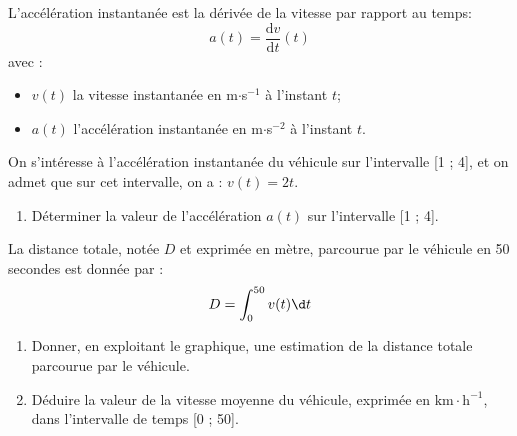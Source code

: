 L'accélération instantanée est la dérivée de la vitesse par rapport au temps:
\[a(t)=\dfrac{\mathrm{d}v}{\mathrm{d}t}(t)\]
avec :
\begin{itemize}[label=$\bullet$]
\item $v(t)$ la vitesse instantanée en m$\cdot$s$^{-1}$ à l'instant $t$;
\item $a(t)$ l'accélération instantanée en m$\cdot$s$^{-2}$ à l'instant $t$.
\end{itemize}

On s'intéresse à l'accélération instantanée du véhicule sur l'intervalle [1 ; 4], et on admet que sur cet intervalle, on a : $v(t) = 2t$.

\begin{enumerate}[start=2]
\item Déterminer la valeur de l'accélération $a(t)$ sur l'intervalle [1 ; 4].
\end{enumerate}
La distance totale, notée $D$ et exprimée en mètre, parcourue par le véhicule en 50 secondes est donnée par :
\[D = \int_0^{50} v(t)\d t\]

\begin{enumerate}[resume]
\item Donner, en exploitant le graphique, une estimation de la distance totale parcourue par le véhicule.
\item Déduire la valeur de la vitesse moyenne du véhicule, exprimée en $\text{km}\cdot\text{h}^{-1}$, dans l'intervalle de temps [0 ; 50].
\end{enumerate}

\bigskip
